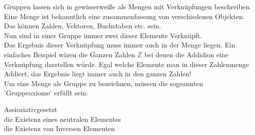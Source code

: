 \documentclass[a4paper,12pt]{scrartcl}
\begin{document}
Gruppen lassen sich in gewisserweiße als Mengen mit Verknüpfungen beschreiben.\\
Eine Menge ist bekanntlich eine zusammenfassung von verschiedenen Objekten. Das können Zahlen, Vektoren, Buchstaben etc. sein.\\ Nun sind in einer Gruppe immer zwei dieser Elemente Verknüpft. \\
Das Ergebnis dieser Verknüpfung muss immer auch in der Menge liegen.
Ein einfaches Beispiel wären die Ganzen Zahlen $\mathbb{Z}$ bei denen die Addidion eine Verknüpfung darstellen würde. Egal welche Elemente man in dieser Zahlenmenge Addiert, das Ergebnis liegt immer auch in den ganzen Zahlen!\\
Um eine Menge als Gruppe zu bezeichnen, müssen die sogeannten 'Gruppeaxiome' erfüllt sein:
\begin{center}
  Assioziativgesetzt\\
  die Existenz eines neutralen Elementes\\
  die Existenz von Inversen Elementen
\end{center}
\end{document}
